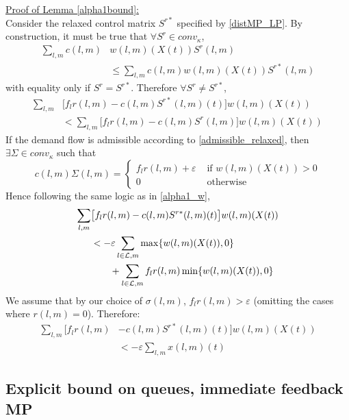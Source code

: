 \underline{Proof of Lemma \ref{alpha1bound}:} \\

Consider the relaxed control matrix $S^{r*}$ specified by \eqref{distMP_LP}. By construction, it must be true that $ \forall S^r \in conv_{\kappa}$, 
\begin{align} \nonumber
\sum_{l,m}c(l,m)& w(l,m)(X(t))S^r (l,m) \\
&\leq \sum_{l,m}c(l,m)w(l,m)(X(t))S^{r*}(l,m) 
\end{align}
with equality only if $S^r = S^{r*}$. 
Therefore $\forall S^r \neq S^{r*}$,
\begin{align} \nonumber
 \sum_{l,m}&\big[f_{l}r(l,m) - c(l,m)S^{r*}(l,m)(t)\big]w(l,m)(X(t)) \\
&<   \sum_{l,m}\big[f_{l}r(l,m) - c(l,m)S^r(l,m)\big]w(l,m)(X(t))
\end{align}
If the demand flow is admissible according to \eqref{admissible_relaxed}, then 
$\exists \Sigma \in conv_{\kappa}$ such that 
\begin{equation} \nonumber
c(l,m)\Sigma(l,m) = \begin{cases}
        f_{l}r(l,m) + \varepsilon & \text{ if } w(l,m)(X(t)) > 0 \\
        0 & \text{ otherwise}
    \end{cases}
\end{equation}
Hence following the same logic as in \eqref{alpha1_w}, 
\begin{align} \nonumber
 \sum_{l,m}&\big[f_{l}r(l,m) -  c(l,m)S^{r*}(l,m)(t)\big] w(l,m)(X(t))  \\ \nonumber
&  < -\varepsilon \sum_{l \in \mathcal{L},m} \max\{w(l,m)(X(t)) ,0\} \\
&\qquad +  \sum_{l \in \mathcal{L},m}  f_l r(l,m)  \min\{ w(l,m)(X(t)) ,0\}
\end{align}
We assume that by our choice of $\sigma(l,m)$, $f_{l}r(l,m) > \varepsilon$ (omitting the cases where $r(l,m) = 0$). Therefore:
\begin{align}\nonumber
\sum_{l,m}\big[ f_{l}r(l,m) & - c(l,m)S^{r*}(l,m)(t)\big]w(l,m)(X(t)) \\
&< -\varepsilon \displaystyle\sum_{l,m} x(l,m)(t)
\end{align}







\subsection*{Explicit bound on queues, immediate feedback MP}

